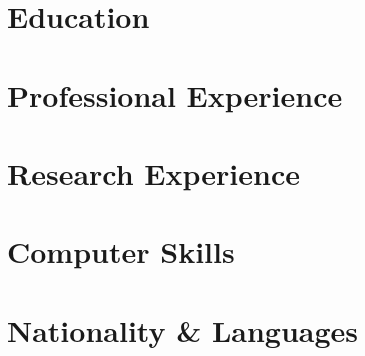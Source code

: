 \documentclass{resume}
\begin{document}
    

\section{Education}
    
    

\section{Professional Experience}
    

\section{Research Experience}
    

\section{Computer Skills}
    
    
\section{Nationality \& Languages}
	
\end{document}
